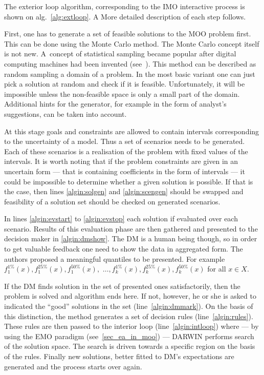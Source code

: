 The exterior loop algorithm, corresponding to the IMO interactive process is
shown on alg.~\ref{alg:extloop}. A More detailed description of each step
follows.

First, one has to generate a set of feasible solutions to the MOO problem
first. This can be done using the Monte Carlo method. The Monte Carlo concept
itself is not new. A~concept of statistical sampling became popular after
digital computing machines had been invented (see~\cite{Met87}). This method
can be described as random sampling a domain of a problem. In the most basic
variant one can just pick a solution at random and check if it is
feasible. Unfortunately, it will be impossible unless the non-feasible space
is only a small part of the domain. Additional hints for the generator, for
example in the form of analyst's suggestions, can be taken into account.

At this stage goals and constraints are allowed to contain intervals
corresponding to the uncertainty of a model. Thus a set of scenarios needs to
be generated. Each of these scenarios is a realisation of the problem with
fixed values of the intervals. It is worth noting that if the problem
constraints are given in an uncertain form --- that is containing coefficients
in the form of intervals --- it could be impossible to determine whether a
given solution is possible. If that is the case, then lines \ref{algin:solgen}
and \ref{algin:scengen} should be swapped and feasibility of a solution set
should be checked on generated scenarios.

In lines \ref{algin:evstart} to \ref{algin:evstop} each solution if evaluated
over each scenario. Results of this evaluation phase are then gathered and
presented to the decision maker in \ref{algin:dmshow}. The DM is a human being
though, so in order to get valuable feedback one need to show the data in
aggregated form. The authors proposed a meaningful quantiles to be
presented. For example $f^{1\%}_1(x), f^{25\%}_1(x), f^{50\%}_1(x),$ $\dots,
f^{1\%}_k(x), f^{25\%}_k(x), f^{50\%}_k(x)$ for all $x \in X$.

If the DM finds solution in the set of presented ones satisfactorily, then the
problem is solved and algorithm ends here. If not, however, he or she is asked
to indicated the ``good'' solutions in the set (line~\ref{algin:dmmark}).  On
the basis of this distinction, the method generates a set of decision rules
(line~\ref{algin:rules}). These rules are then passed to the interior loop
(line~\ref{algin:intloop}) where --- by using the EMO paradigm
(see~\ref{sec_ea_in_moo}) --- DARWIN performs search of the solution
space. The search is driven towards a specific region on the basis of the
rules. Finally new solutions, better fitted to DM's expectations are generated
and the process starts over again.

